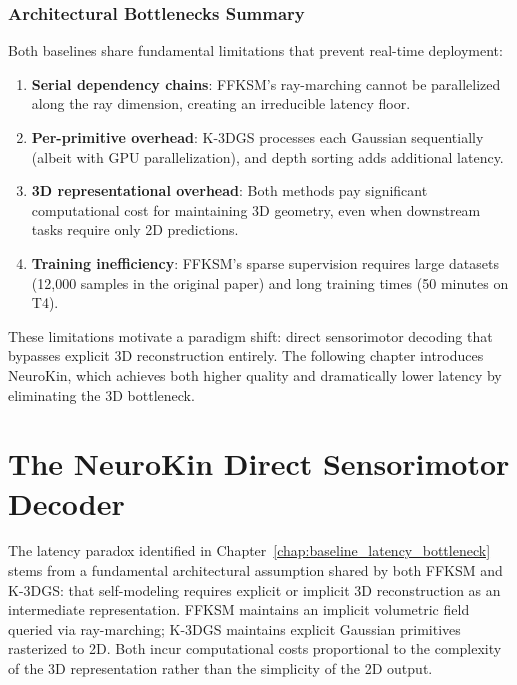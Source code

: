 \documentclass[12pt,a4paper,oneside]{report}
\begin{document}
\subsection{Architectural Bottlenecks Summary}
\label{subsec:architectural_bottlenecks_summary}

Both baselines share fundamental limitations that prevent real-time deployment:
\begin{enumerate}
    \item \textbf{Serial dependency chains}: FFKSM's ray-marching cannot be parallelized along the ray dimension, creating an irreducible latency floor.
    \item \textbf{Per-primitive overhead}: K-3DGS processes each Gaussian sequentially (albeit with GPU parallelization), and depth sorting adds additional latency.
    \item \textbf{3D representational overhead}: Both methods pay significant computational cost for maintaining 3D geometry, even when downstream tasks require only 2D predictions.
    \item \textbf{Training inefficiency}: FFKSM's sparse supervision requires large datasets (12,000 samples in the original paper) and long training times (50 minutes on T4).
\end{enumerate}

These limitations motivate a paradigm shift: direct sensorimotor decoding that bypasses explicit 3D reconstruction entirely. The following chapter introduces NeuroKin, which achieves both higher quality and dramatically lower latency by eliminating the 3D bottleneck.
\clearpage


\chapter{The NeuroKin Direct Sensorimotor Decoder}
\label{chap:neurokin_decoder}

The latency paradox identified in Chapter~\ref{chap:baseline_latency_bottleneck} stems from a fundamental architectural assumption shared by both FFKSM and K-3DGS: that self-modeling requires explicit or implicit 3D reconstruction as an intermediate representation. FFKSM maintains an implicit volumetric field queried via ray-marching; K-3DGS maintains explicit Gaussian primitives rasterized to 2D. Both incur computational costs proportional to the complexity of the 3D representation rather than the simplicity of the 2D output.
\end{document}
